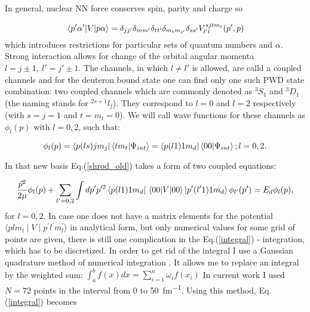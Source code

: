     In general, nuclear NN force conserves spin, parity and charge so

    \begin{equation}
        \matrixel*{p^\prime\alpha^\prime}{V}{p\alpha} = \delta_{jj'}\delta_{mm'}\delta_{tt'}\delta_{m_tm_{t'}}
        \delta_{ss'}V^{sjtm_t}_{l'l}(p',p)
        \label{conservation}
    \end{equation}
    which introduces restrictions for particular sets of quantum numbers and $\alpha$.
    Strong interaction allows for change of the orbital angular momenta $l = j \pm 1,~l'=j'\pm1$.
    The channels, in which  $l \neq l'$ is allowed,
    are calld a coupled channels and for the deuteron bound state 
    one can find only one such PWD state combination:
    two coupled channels 
    which are commonly denoted as $^3S_1$ and $^3D_1$ (the naming stands for $^{2s+1}l_j$). They correspond 
    to $l=0$ and $l=2$ respectively (with $s = j = 1$ and $t = m_t = 0$). 
    We will call wave functions for these channels as $\phi_l(p)$ with $l=0,2$, such that:

    
    \begin{equation}
        \phi_l(p) = \bra{p (ls) j m_j}\braket{t m_t}{\Psi_{int}} = \bra{p(l1)1m_d} \braket{00}{\Psi_{int}}; l=0,2.
        \label{deut_waves}
    \end{equation}

    In that new basis Eq.(\ref{shrod_old}) takes a form of two coupled equations:

    \begin{equation}
        \frac{\vec{p}^2}{2\mu} \phi_l(p) +
        \sum_{l^\prime =0,2} \int d p^\prime p^{\prime 2} 
        \bra{p(l1)1m_d} \matrixel{00}{V}{00} \ket{p^\prime(l^\prime1)1m_d}
        \phi_{l^\prime}(p^\prime) = 
        E_d \phi_l(p),
        \label{integral}
    \end{equation}
    for $l=0,2$. In case one does not have a matrix elements for the potential 
    $\langle plm_l \mid V \mid p^\prime l^\prime m_l^\prime  \rangle$ in analytical form,
    but only numerical values for some grid of points are given, 
    there is still one complication in the Eq.(\ref{integral}) - integration, which has to be discretized.
    In order to get rid of the integral I use a Gaussian quadrature 
    method of numerical integration \cite{jacobi1826ueber}.
    It allows me to replace an integral by the weighted sum:
        $\int_a^b f(x)dx = \sum_{i=1}^n \omega_i f(x_i)$
    In current work I used $N=72$ points in the interval from $0$ to \SI{50}{fm^{-1}}. 
    Using this method, Eq.(\ref{integral}) becomes  

